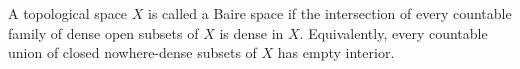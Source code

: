 A topological space $X$ is called a Baire space if the intersection of every countable family of dense open subsets of $X$ is dense in $X$. Equivalently, every countable union of closed nowhere-dense subsets of $X$ has empty interior.
